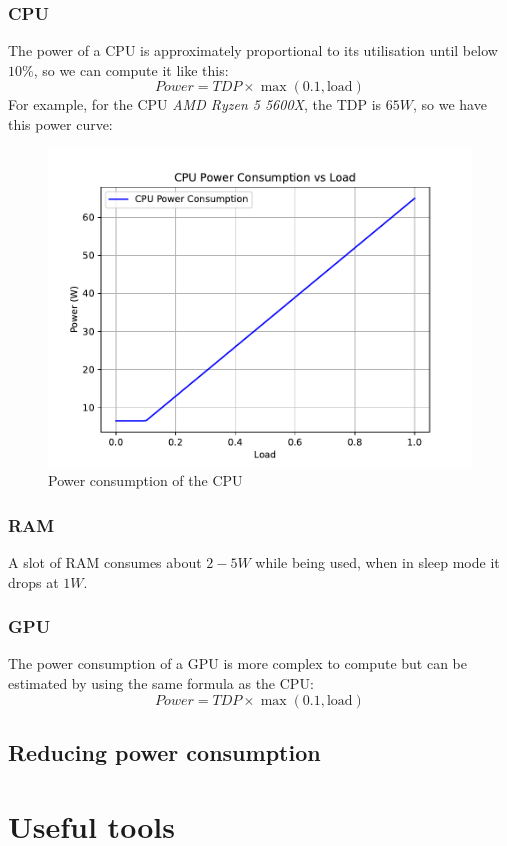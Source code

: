\documentclass[12pt, openany]{report}
\theoremstyle{definition}
\begin{document}
\subsection{CPU}
The power of a CPU is approximately proportional to its utilisation until below $10\%$, so we can compute it like this:
\begin{equation}
	Power = TDP \times \max(0.1, \text{load})
\end{equation}
For example, for the CPU \textit{AMD Ryzen 5 5600X}, the TDP is $65W$, so we have this power curve:
\begin{figure}[H]
	\centering
	\includegraphics[width=0.8\linewidth]{img/CPU_power.pdf}
	\caption{Power consumption of the CPU}
	\label{fig:CPU_power}
\end{figure}
\subsection{RAM}
A slot of RAM consumes about $2-5W$ while being used, when in sleep mode it drops at $1 W$.
\subsection{GPU}
The power consumption of a GPU is more complex to compute but can be estimated by using the same formula as the CPU:
\begin{equation}
	Power = TDP \times \max(0.1, \text{load})
\end{equation}
\section{Reducing power consumption}
\chapter{Useful tools}
\end{document}
